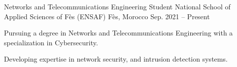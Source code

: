 

\begin{cventries}

  \cventry
    {Networks and Telecommunications Engineering Student} %
    {National School of Applied Sciences of Fès (ENSAF)} %
    {Fès, Morocco} %
    {Sep. 2021 – Present} %
    {
      \begin{cvitems} %
        \item {Pursuing a degree in Networks and Telecommunications Engineering with a specialization in Cybersecurity.}  
        \item {Developing expertise in network security, and intrusion detection systems.}  
      \end{cvitems}
    }
\end{cventries}
